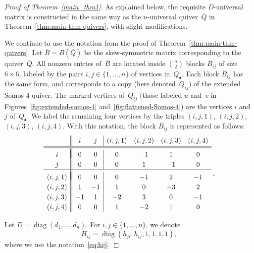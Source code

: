 \documentclass[ALCO,ThmDefs,Unicode,epreuves,published]{cedram}
\DeclareMathOperator{\diag}{diag}
\begin{document}
\begin{proof}[Proof of Theorem~\ref{main_thm1}]
As explained below, the requisite $D$-universal matrix is constructed in the same way as the $n$-universal quiver~$\overline Q$ in Theorem~\ref{thm:main-thm-quivers}, with slight modifications. 

We continue to use the notation from the proof of Theorem~\ref{thm:main-thm-quivers}. 
Let $\overline B=B(\overline Q)$ be the skew-symmetric matrix corresponding to the quiver~$\overline Q$. All nonzero entries of~$\overline B$ are located inside $\binom{n}{2}$ blocks $\overline B_{ij}$ of size $6\times 6$, labeled by the pairs $i,j\in\{1,\dots,n\}$ of vertices in~$Q_\bullet$. Each block $\overline B_{ij}$ has the same form, and corresponds to a copy (here denoted~$Q_{ij}$) of the extended Somos-4 quiver. The marked vertices of~$Q_{ij}$ (those labeled $u$ and~$v$ in Figures~\ref{fig:extended-somos-4} and~\ref{fig:flattened-Somos-4}) are the vertices $i$ and~$j$ of~$Q_\bullet$. We label the remaining four vertices by the triples $(i,j,1)$, $(i,j,2)$, $(i,j,3)$, $(i,j,4)$. With this notation, the block $\overline B_{ij}$ is represented as follows:
\begin{equation}
\label{eq:overline-Bij}
\renewcommand{\arraystretch}{1.2}
\begin{array}{c||cc|cccc}
& i & j & (i,j,1) & (i,j,2) & (i,j,3) & (i,j,4) \\[1pt]
\hline
\hline
\\[-12pt]
i & 0 & 0 & 0 & -1 & 1 & 0 \\
j & 0 & 0 & 0 & 1 & -1 & 0 \\
\hline
\\[-11pt]
(i,j,1) & 0 & 0 & 0 & -1 & 2 & -1 \\
(i,j,2) & 1 & -1 & 1 & 0 & -3 & 2 \\
(i,j,3) & -1 &1 &-2 & 3 & 0 & -1 \\
(i,j,4) & 0 & 0 & 1 & -2 & 1 &0 
\end{array}\,.
\end{equation}

Let $D=\diag (d_1,\dots,d_n)$. For $i,j\in\{1,\dots,n\}$, we denote
\[
H_{ij}=\diag (h_{ji},h_{ij},1,1,1,1), 
\]
where we use the notation~\eqref{eq:hij}. 


\end{proof}
\end{document}
